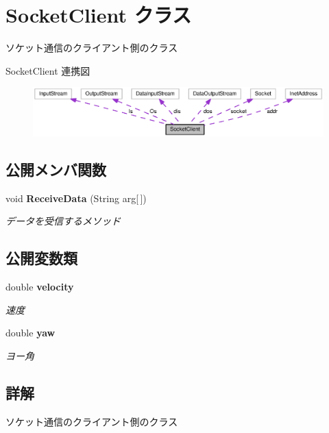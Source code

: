 \section{Socket\-Client クラス}
\label{class_socket_client}


ソケット通信のクライアント側のクラス  




Socket\-Client 連携図
\nopagebreak
\begin{figure}[H]
\begin{center}
\leavevmode
\includegraphics[width=350pt]{class_socket_client__coll__graph}
\end{center}
\end{figure}
\subsection*{公開メンバ関数}
\begin{DoxyCompactItemize}
\item 
void {\bf Receive\-Data} (String arg[$\,$])
\begin{DoxyCompactList}\small\item\em データを受信するメソッド \end{DoxyCompactList}\end{DoxyCompactItemize}
\subsection*{公開変数類}
\begin{DoxyCompactItemize}
\item 
double {\bf velocity}
\begin{DoxyCompactList}\small\item\em 速度 \end{DoxyCompactList}\item 
double {\bf yaw}
\begin{DoxyCompactList}\small\item\em ヨー角 \end{DoxyCompactList}\end{DoxyCompactItemize}


\subsection{詳解}
ソケット通信のクライアント側のクラス 

